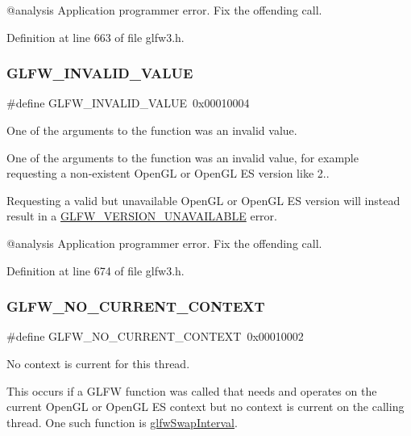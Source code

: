 @analysis Application programmer error. Fix the offending call. 

Definition at line 663 of file glfw3.\+h.

\mbox{\label{group__errors_gaaf2ef9aa8202c2b82ac2d921e554c687}} 
\subsubsection{\texorpdfstring{GLFW\_INVALID\_VALUE}{GLFW\_INVALID\_VALUE}}
{\footnotesize\ttfamily \#define G\+L\+F\+W\+\_\+\+I\+N\+V\+A\+L\+I\+D\+\_\+\+V\+A\+L\+UE~0x00010004}



One of the arguments to the function was an invalid value. 

One of the arguments to the function was an invalid value, for example requesting a non-\/existent Open\+GL or Open\+GL ES version like 2..

Requesting a valid but unavailable Open\+GL or Open\+GL ES version will instead result in a \mbox{\hyperlink{group__errors_gad16c5565b4a69f9c2a9ac2c0dbc89462}{G\+L\+F\+W\+\_\+\+V\+E\+R\+S\+I\+O\+N\+\_\+\+U\+N\+A\+V\+A\+I\+L\+A\+B\+LE}} error.

@analysis Application programmer error. Fix the offending call. 

Definition at line 674 of file glfw3.\+h.

\mbox{\label{group__errors_gaa8290386e9528ccb9e42a3a4e16fc0d0}} 
\subsubsection{\texorpdfstring{GLFW\_NO\_CURRENT\_CONTEXT}{GLFW\_NO\_CURRENT\_CONTEXT}}
{\footnotesize\ttfamily \#define G\+L\+F\+W\+\_\+\+N\+O\+\_\+\+C\+U\+R\+R\+E\+N\+T\+\_\+\+C\+O\+N\+T\+E\+XT~0x00010002}



No context is current for this thread. 

This occurs if a G\+L\+FW function was called that needs and operates on the current Open\+GL or Open\+GL ES context but no context is current on the calling thread. One such function is \mbox{\hyperlink{group__context_ga12a595c06947cec4967c6e1f14210a8a}{glfw\+Swap\+Interval}}.


